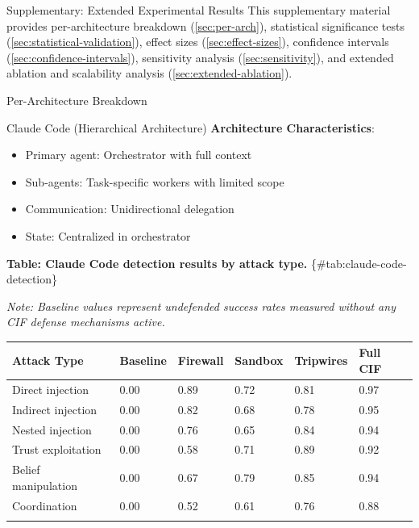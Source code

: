\documentclass[
  ignorenonframetext,
]{beamer}
\author{\texorpdfstring{}{}}
\date{}
\newcounter{none} %
\begin{document}
\begin{frame}
\newpage
\end{frame}

\begin{frame}[fragile]{Supplementary: Extended Experimental Results}
\protect{}\label{sec:extended-results}
This supplementary material provides per-architecture breakdown
(\cref{sec:per-arch}), statistical significance tests
(\cref{sec:statistical-validation}), effect sizes
(\cref{sec:effect-sizes}), confidence intervals
(\cref{sec:confidence-intervals}), sensitivity analysis
(\cref{sec:sensitivity}), and extended ablation and scalability analysis
(\cref{sec:extended-ablation}).

\begin{block}{Per-Architecture Breakdown}
\protect{}\label{sec:per-arch}
\begin{block}{Claude Code (Hierarchical Architecture)}
\protect{}\label{sec:claude-code}
\textbf{Architecture Characteristics}:

\begin{itemize}
\item Primary agent: Orchestrator with full context
\item Sub-agents: Task-specific workers with limited scope
\item Communication: Unidirectional delegation
\item State: Centralized in orchestrator
\end{itemize}

\textbf{Table: Claude Code detection results by attack type.}
\{\#tab:claude-code-detection\}

\emph{Note: Baseline values represent undefended success rates measured
without any CIF defense mechanisms active.}

{\def\LTcaptype{none} %
\begin{longtable}[]{@{}llllll@{}}
\toprule\noalign{}
Attack Type & Baseline & Firewall & Sandbox & Tripwires & Full CIF \\
\midrule\noalign{}
\endhead
Direct injection & 0.00 & 0.89 & 0.72 & 0.81 & 0.97 \\
Indirect injection & 0.00 & 0.82 & 0.68 & 0.78 & 0.95 \\
Nested injection & 0.00 & 0.76 & 0.65 & 0.84 & 0.94 \\
Trust exploitation & 0.00 & 0.58 & 0.71 & 0.89 & 0.92 \\
Belief manipulation & 0.00 & 0.67 & 0.79 & 0.85 & 0.94 \\
Coordination & 0.00 & 0.52 & 0.61 & 0.76 & 0.88 \\
\bottomrule\noalign{}
\end{longtable}
}


\end{block}
\end{block}
\end{frame}
\end{document}
